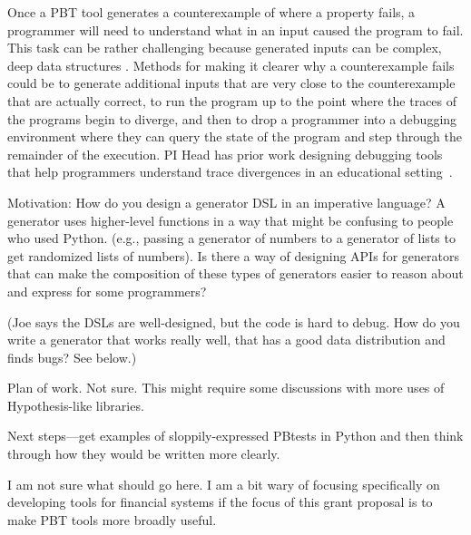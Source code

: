 Once a PBT tool generates a counterexample of where a property fails, a programmer will need to understand what in an input caused the program to fail. This task can be rather challenging because generated inputs can be complex, deep data structures . Methods for making it clearer why a counterexample fails could be to generate additional inputs that are very close to the counterexample that are actually correct, to run the program up to the point where the traces of the programs begin to diverge, and then to drop a programmer into a debugging environment where they can query the state of the program and step through the remainder of the execution. PI Head has prior work designing debugging tools that help programmers understand trace divergences in an educational setting~\cite{suzuki2017tracediff}.  


Motivation: How do you design a generator DSL in an imperative language? A generator uses higher-level functions in a way that might be confusing to people who used Python.  (e.g., passing a generator of numbers to a generator of lists to get randomized lists of numbers). Is there a way of designing APIs for generators that can make the composition of these types of generators easier to reason about and express for some programmers?

(Joe says the DSLs are well-designed, but the code is hard to debug. How do you write a generator that works really well, that has a good data distribution and finds bugs? See below.)

Plan of work. Not sure. This might require some discussions with more uses of Hypothesis-like libraries.

Next steps—get examples of sloppily-expressed PBtests in Python and then think through how they would be written more clearly.




I am not sure what should go here. I am a bit wary of focusing specifically on developing tools for financial systems if the focus of this grant proposal is to make PBT tools more broadly useful.  

